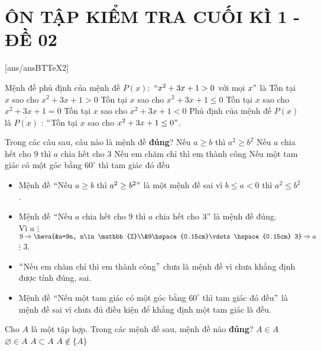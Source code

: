 \section*{ÔN TẬP KIỂM TRA CUỐI KÌ 1 - ĐỀ 02}
\setcounter{ex}{0}\setcounter{bt}{0}
[ans/ansBTTeX2]

\begin{ex}%
Mệnh đề phủ định của mệnh đề $P(x):$ $``x^2+3x+1>0$ với mọi $x"$ là
\choice
{Tồn tại $x$ sao cho $x^2+3x+1>0$}
{\True Tồn tại $x$ sao cho $x^2+3x+1\le 0$}
{Tồn tại $x$ sao cho $x^2+3x+1=0$ 	}
{Tồn tại $x$ sao cho $x^2+3x+1<0$}
\loigiai
{
Phủ định của mệnh đề $P(x)$ là $\overline{P(x)}$ : $``$Tồn tại $x$ sao cho $x^2+3x+1\le 0"$.
}
\end{ex}

\begin{ex}%
Trong các câu sau, câu nào là mệnh đề \textbf{đúng}?
\choice
{Nếu $a\ge b$ thì $a^2\ge b^2$}
{\True Nếu $a$ chia hết cho $9$ thì $a$ chia hết cho $3$}
{Nếu em chăm chỉ thì em thành công}
{Nếu một tam giác có một góc bằng $60^\circ $ thì tam giác đó đều}
\loigiai
{
\begin{itemize}
\item Mệnh đề $``$Nếu $a\ge b$ thì $a^2\ge b^2"$ là một mệnh đề sai vì $b\le a < 0$ thì $a^2\le b^2$ .
\item Mệnh đề $``$Nếu $a$ chia hết cho $9$ thì $a$ chia hết cho $3"$ là mệnh đề đúng.\\
Vì $a$ $\vdots$ $9\Rightarrow \heva{&a=9n, n\in \mathbb{Z}\\&9\hspace{0.15cm}\vdots\hspace{0.15cm} 3}\Rightarrow a$ $\vdots$  $3$.
\item $``$Nếu em chăm chỉ thì em thành công$"$ chưa là mệnh đề vì chưa khẳng định được tính đúng, sai.
\item Mệnh đề $``$Nếu một tam giác có một góc bằng $60^\circ $ thì tam giác đó đều$"$ là mệnh đề sai vì chưa đủ điều kiện để khẳng định một tam giác là đều.
\end{itemize}
}
\end{ex}

\begin{ex} %
Cho $A$ là một tập hợp. Trong các mệnh đề sau, mệnh đề nào \textbf{đúng}?
\choice
{$A\in A$}
{$\varnothing \in A$}
{\True $A \subset A$}
{$A \notin \{A\}$}
\end{ex}

